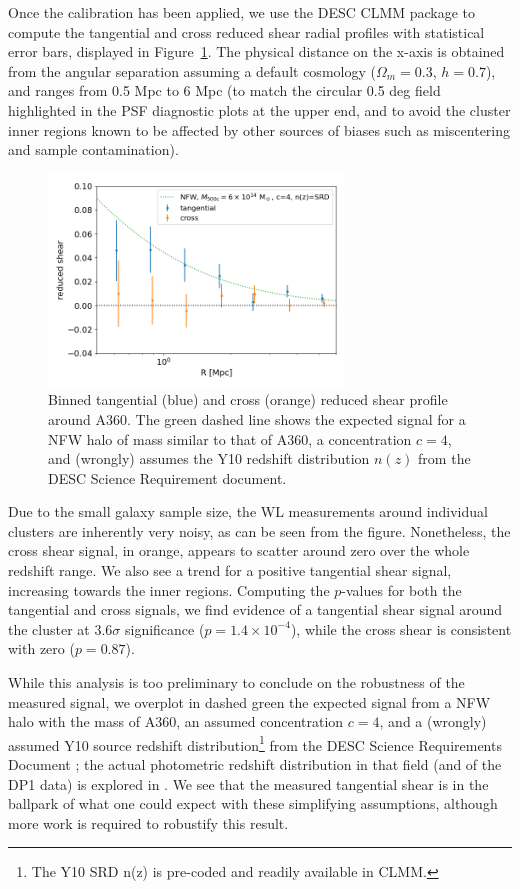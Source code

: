 \documentclass[SE,lsstdraft,authoryear,toc]{lsstdoc}
\begin{document}
Once the calibration has been applied, we use the DESC CLMM package \citep{2021MNRAS.508.6092A} to compute the tangential and cross reduced shear radial profiles with statistical error bars, displayed in Figure~\ref{fig:shear_profile}. The physical distance on the x-axis is obtained from the angular separation assuming a default cosmology ($\Omega_m=0.3$, $h=0.7$), and ranges from 0.5 Mpc to 6 Mpc (to match the circular 0.5 deg field highlighted in the PSF diagnostic plots at the upper end, and to avoid the cluster inner regions known to be affected by other sources of biases such as miscentering and sample contamination). 

\begin{figure}
\centering
\includegraphics[width=0.7\textwidth]{Figures/shear_profile.png}
\caption{Binned tangential (blue) and cross (orange) reduced shear profile around A360. The green dashed line shows the expected signal for a NFW halo of mass similar to that of A360, a concentration $c=4$, and (wrongly) assumes the Y10 redshift distribution $n(z)$ from the DESC Science Requirement document. \label{fig:shear_profile}}
\end{figure}


Due to the small galaxy sample size, the WL measurements around individual clusters are inherently very noisy, as can be seen from the figure. Nonetheless, the cross shear signal, in orange, appears to scatter around zero over the whole redshift range. We also see a trend for a positive tangential shear signal, increasing towards the inner regions. Computing the $p$-values for both the tangential and cross signals, we find evidence of a tangential shear signal around the cluster at $3.6\sigma$ significance ($p = 1.4 \times 10^{-4}$), while the cross shear is consistent with zero ($p = 0.87$).

While this analysis is too preliminary to conclude on the robustness of the measured signal, we overplot in dashed green the expected signal from a NFW halo with the mass of A360, an assumed concentration $c=4$, and a (wrongly) assumed Y10 source redshift distribution\footnote{The Y10 SRD n(z) is pre-coded and readily available in CLMM.} from the DESC Science Requirements Document \citep{2018arXiv180901669T}; the actual photometric redshift distribution in that field (and of the DP1 data) is explored in . We see that the measured tangential shear is in the ballpark of what one could expect with these simplifying assumptions, although more work is required to robustify this result.
\end{document}

